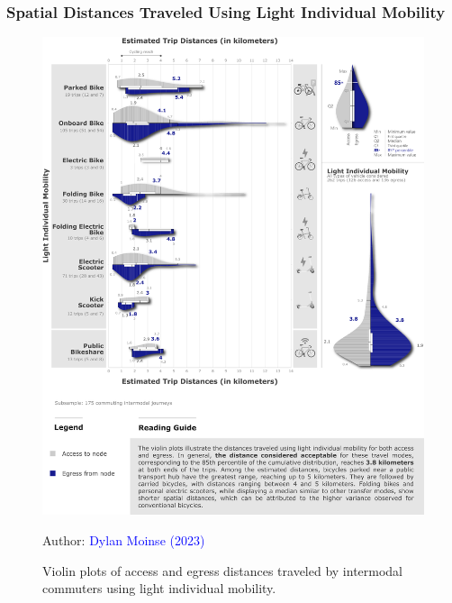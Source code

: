\begin{refsegment}
\subsubsection*{Spatial Distances Traveled Using Light Individual Mobility
    \label{chap5:distances-spatiales-parcourues}
    }

\begin{figure}[h!]\vspace*{4pt}
    \caption{Violin plots of access and egress distances traveled by intermodal commuters using light individual mobility.}
    \label{fig-chap5:diagrammes-violons}
    \centerline{\includegraphics[width=1\columnwidth]{src/Figures/Chap-5/EN_Distances_Violons_Navetteurs.png}}
    \vspace{5pt}
    \begin{flushright}\scriptsize{
    Author: \textcolor{blue}{Dylan Moinse (2023)}
    }\end{flushright}
\end{figure}


\end{refsegment}
